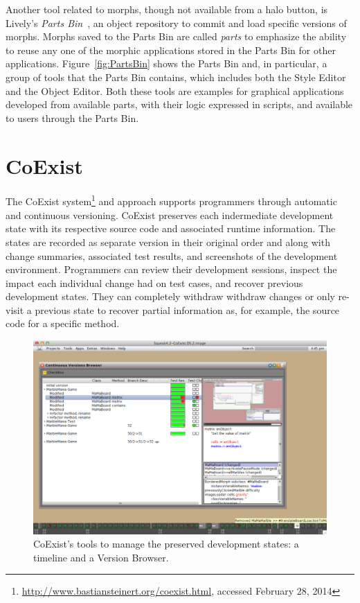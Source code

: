 Another tool related to morphs, though not available from a halo button, is Lively's \emph{Parts Bin}~\cite{Lincke2012LPC}, an object repository to commit and load specific versions of morphs.
Morphs saved to the Parts Bin are called \emph{parts} to emphasize the ability to reuse any one of the morphic applications stored in the Parts Bin for other applications.
Figure~\ref{fig:PartsBin} shows the Parts Bin and, in particular, a group of tools that the Parts Bin contains, which includes both the Style Editor and the Object Editor.
Both these tools are examples for graphical applications developed from available parts, with their logic expressed in scripts, and available to users through the Parts Bin.


\section{CoExist}

The CoExist system\footnote{\url{http://www.bastiansteinert.org/coexist.html}, accessed February 28, 2014} and approach supports programmers through automatic and continuous versioning.
CoExist preserves each indermediate development state with its respective source code and associated runtime information.
The states are recorded as separate version in their original order and along with change summaries, associated test results, and screenshots of the development environment.
Programmers can review their development sessions, inspect the impact each individual change had on test cases, and recover previous development states.
They can completely withdraw withdraw changes or only re-visit a previous state to recover partial information as, for example, the source code for a specific method.

\begin{figure}[h]
    \centering
    \includegraphics[width=\textwidth]{figures/2_background/4_coexistTools.pdf}
    \caption{CoExist's tools to manage the preserved development states: a timeline and a Version Browser.}
    \label{fig:CoExist}
\end{figure}

